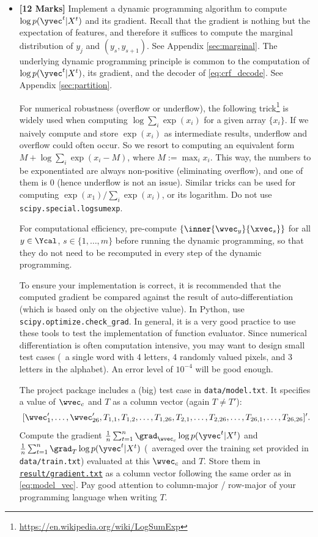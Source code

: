 \documentclass[11pt]{report}
\begin{document}
\begin{itemize}
	\item[(2a)] {\bf [12 Marks]} Implement a dynamic programming algorithm to compute $\log p(\yvec^t | X^t)$ and its gradient.  Recall that the gradient is nothing but the expectation of features, and therefore it suffices to compute the marginal distribution of $y_j$ and $(y_s, y_{s+1})$. See Appendix \ref{sec:marginal}.
	The underlying dynamic programming principle is common to the computation of $\log p(\yvec^t | X^t)$, its gradient, and the decoder of \eqref{eq:crf_decode}.
	See Appendix \ref{sec:partition}.
	
	For numerical robustness (overflow or underflow), the following trick\footnote{\href{https://en.wikipedia.org/wiki/LogSumExp}{\url{https://en.wikipedia.org/wiki/LogSumExp}}} is widely used when computing $\log \sum_i \exp(x_i)$ for a given array $\{x_i\}$.  If we naively compute and store $\exp(x_i)$ as intermediate results, underflow and overflow could often occur.  So we resort to computing an equivalent form $M + \log \sum_i \exp(x_i - M)$, where $M := \max_i x_i$.  This way, the numbers to be exponentiated are always non-positive (eliminating overflow), and one of them is 0 (hence underflow is not an issue).  Similar tricks can be used for computing $\exp(x_1) / \sum_i \exp(x_i)$, or its logarithm.
	Do not use \verb#scipy.special.logsumexp#.
	
	For computational efficiency, pre-compute $\{\inner{\wvec_y}{\xvec_s}\}$ for all $y \in \Ycal$, $s \in \{1, \ldots, m\}$ before running the dynamic programming,
	so that they do not need to be recomputed in every step of the dynamic programming.
	
	To ensure your implementation is correct, it is recommended that the computed gradient be compared against the result of auto-differentiation (which is based only on the objective value).
	In Python, use \verb#scipy.optimize.check_grad#.	
	In general, it is a very good practice to use these tools to test the implementation of function evaluator.
	Since numerical differentiation is often computation intensive, you may want to design small test cases (\eg\ a single word with 4 letters, 4 randomly valued pixels, and 3 letters in the alphabet).
	An error level of $10^{-4}$ will be good enough.
	
	The project package includes a (big) test case in \verb#data/model.txt#.
	It specifies a value of $\wvec_c$ and $T$ as a column vector (again $T \neq T'$):
	\begin{align}
		\label{eq:model_vec}
		[\wvec'_1, \ldots, \wvec'_{26}, T_{1,1}, T_{1,2}, \ldots, T_{1, 26}, T_{2,1}, \ldots, T_{2, 26}, \ldots, T_{26,1}, \ldots, T_{26, 26}]'.
	\end{align}
	Compute the gradient $\frac{1}{n} \sum_{t=1}^n \grad_{\wvec_c} \log p(\yvec^t | X^t)$ and
	$\frac{1}{n} \sum_{t=1}^n \grad_{T} \log p(\yvec^t | X^t)$
	(\ie\ averaged over the training set provided in \verb#data/train.txt#) evaluated at this $\wvec_c$ and $T$.
	Store them in \underline{\texttt{result/gradient.txt}} as a column vector following the same order as in \eqref{eq:model_vec}.
	Pay good attention to column-major / row-major of your programming language when writing $T$.
	

\end{itemize}
\end{document}
